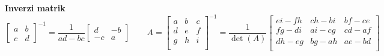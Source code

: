 \documentclass[11pt,a4paper]{amsart}
\theoremstyle{definition} %
\theoremstyle{plain} %
\begin{document}
\textbf{Inverzi matrik}
\[
  \begin{bmatrix}
    a & b \\ c & d
  \end{bmatrix}^{-1}
  =
  \frac{1}{ad - bc}
  \begin{bmatrix}
    d & -b \\ -c & a
  \end{bmatrix}
  \qquad A =
  \begin{bmatrix}
    a & b & c \\
    d & e & f \\
    g & h & i \\
  \end{bmatrix}^{-1}
 =
  \frac{1}{\det(A)}
\begin{bmatrix}
e i-f h & c h-b i & b f-c e \\
f g-d i & a i-c g & c d-a f \\
d h-e g & b g-a h & a e-b d \\
\end{bmatrix}
\]
\end{document}
